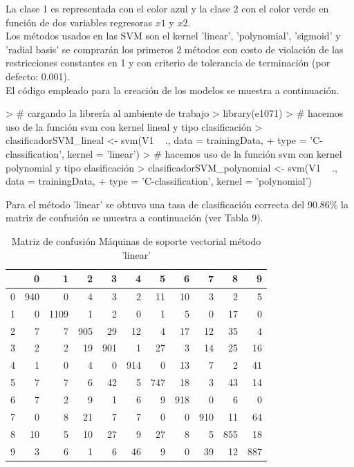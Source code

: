\documentclass{article}
\begin{document}
La clase 1 es representada con el color azul y la clase 2 con el color verde en función de dos variables regresoras $x1$ y $x2$. \\

Los métodos usados en las SVM son el kernel 'linear', 'polynomial', 'sigmoid' y 'radial basis' se comprarán los primeros 2 métodos con costo de violación de las restricciones constantes en 1 y con criterio de tolerancia de terminación (por defecto: 0.001). \\

El código empleado para la creación de los modelos se muestra a continuación.

\begin{Schunk}
\begin{Sinput}
> # cargando la librería al ambiente de trabajo
> library(e1071)
> # hacemos uso de la función svm con kernel lineal y tipo clasificación
> clasificadorSVM_lineal <- svm(V1 ~ ., data = trainingData, 
+                        type = 'C-classification', kernel = 'linear')
> # hacemos uso de la función svm con kernel polynomial y tipo clasificación
> clasificadorSVM_polynomial <- svm(V1 ~ ., data = trainingData, 
+                               type = 'C-classification', kernel = 'polynomial')
\end{Sinput}
\end{Schunk}




Para el método 'linear' se obtuvo una tasa de clasificación correcta del 90.86\% la matriz de confusión se muestra a continuación (ver Tabla 9).

\begin{table}[H]
\caption{\small{Matriz de confusión Máquinas de soporte vectorial método 'linear'}}
\centering
\begin{tabular}{r|rrrrrrrrrr}
  \hline
 & 0 & 1 & 2 & 3 & 4 & 5 & 6 & 7 & 8 & 9 \\ 
  \hline
0 & 940 &   0 &   4 &   3 &   2 &  11 &  10 &   3 &   2 &   5 \\ 
  1 &   0 & 1109 &   1 &   2 &   0 &   1 &   5 &   0 &  17 &   0 \\ 
  2 &   7 &   7 & 905 &  29 &  12 &   4 &  17 &  12 &  35 &   4 \\ 
  3 &   2 &   2 &  19 & 901 &   1 &  27 &   3 &  14 &  25 &  16 \\ 
  4 &   1 &   0 &   4 &   0 & 914 &   0 &  13 &   7 &   2 &  41 \\ 
  5 &   7 &   7 &   6 &  42 &   5 & 747 &  18 &   3 &  43 &  14 \\ 
  6 &   7 &   2 &   9 &   1 &   6 &   9 & 918 &   0 &   6 &   0 \\ 
  7 &   0 &   8 &  21 &   7 &   7 &   0 &   0 & 910 &  11 &  64 \\ 
  8 &  10 &   5 &  10 &  27 &   9 &  27 &   8 &   5 & 855 &  18 \\ 
  9 &   3 &   6 &   1 &   6 &  46 &   9 &   0 &  39 &  12 & 887 \\ 
   \hline
\end{tabular}
\end{table}
\end{document}

